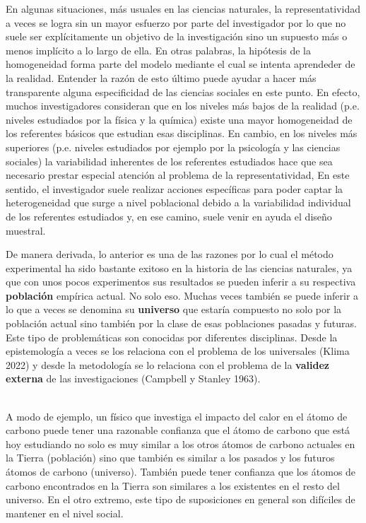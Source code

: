 \documentclass[
  spanish,
  a4paper,
]{scrreprt}
\begin{document}
En algunas situaciones, más usuales en las ciencias naturales, la
representatividad a veces se logra sin un mayor esfuerzo por parte del
investigador por lo que no suele ser explícitamente un objetivo de la
investigación sino un supuesto más o menos implícito a lo largo de ella.
En otras palabras, la hipótesis de la homogeneidad forma parte del
modelo mediante el cual se intenta aprendeder de la realidad. Entender
la razón de esto último puede ayudar a hacer más transparente alguna
especificidad de las ciencias sociales en este punto. En efecto, muchos
investigadores consideran que en los niveles más bajos de la realidad
(p.e. niveles estudiados por la física y la química) existe una mayor
homogeneidad de los referentes básicos que estudian esas disciplinas. En
cambio, en los niveles más superiores (p.e. niveles estudiados por
ejemplo por la psicología y las ciencias sociales) la variabilidad
inherentes de los referentes estudiados hace que sea necesario prestar
especial atención al problema de la representatividad, En este sentido,
el investigador suele realizar acciones específicas para poder captar la
heterogeneidad que surge a nivel poblacional debido a la variabilidad
individual de los referentes estudiados y, en ese camino, suele venir en
ayuda el diseño muestral.

De manera derivada, lo anterior es una de las razones por lo cual el
método experimental ha sido bastante exitoso en la historia de las
ciencias naturales, ya que con unos pocos experimentos sus resultados se
pueden inferir a su respectiva \textbf{población} empírica actual. No
solo eso. Muchas veces también se puede inferir a lo que a veces se
denomina su \textbf{universo} que estaría compuesto no solo por la
población actual sino también por la clase de esas poblaciones pasadas y
futuras. Este tipo de problemáticas son conocidas por diferentes
disciplinas. Desde la epistemología a veces se los relaciona con el
problema de los universales (Klima 2022) y desde la metodología se lo
relaciona con el problema de la \textbf{validez externa} de las
investigaciones (Campbell y Stanley 1963).\\
\strut \\
A modo de ejemplo, un físico que investiga el impacto del calor en el
átomo de carbono puede tener una razonable confianza que el átomo de
carbono que está hoy estudiando no solo es muy similar a los otros
átomos de carbono actuales en la Tierra (población) sino que también es
similar a los pasados y los futuros átomos de carbono (universo).
También puede tener confianza que los átomos de carbono encontrados en
la Tierra son similares a los existentes en el resto del universo. En el
otro extremo, este tipo de suposiciones en general son difíciles de
mantener en el nivel social.
\end{document}
